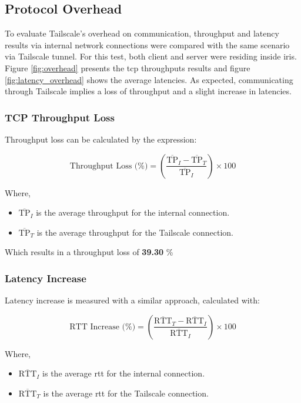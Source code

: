 \documentclass[11pt,twoside,a4paper]{report}
\begin{document}
\subsection{Protocol Overhead}

To evaluate Tailscale's overhead on communication, throughput and latency results via internal network connections were compared with the same scenario via Tailscale tunnel. For this test, both client and server were residing inside \ac{iris}. Figure \ref{fig:overhead} presents the \ac{tcp} throughputs results and figure \ref{fig:latency_overhead} shows the average latencies. As expected, communicating through Tailscale implies a loss of throughput and a slight increase in latencies.

\subsubsection{TCP Throughput Loss}

Throughput loss can be calculated by the expression:

\[
\text{Throughput Loss (\%)} = \left( \frac{ \overline{\text{TP}}_I - \overline{\text{TP}}_T }{ \overline{\text{TP}}_I } \right) \times 100
\]

Where,

\begin{itemize}
    \item \( \overline{\text{TP}}_I \) is the average throughput for the internal connection.
    \item \( \overline{\text{TP}}_T \) is the average throughput for the Tailscale connection.
\end{itemize}

Which results in a throughput loss of \textbf{39.30} \%


\subsubsection{Latency Increase}

Latency increase is measured with a similar approach, calculated with:

\[
\text{RTT Increase (\%)} = \left( \frac{ \overline{\text{RTT}}_T - \overline{\text{RTT}}_I}{ \overline{\text{RTT}}_I }\right) \times 100
\]

Where,

\begin{itemize}
    \item \( \overline{\text{RTT}}_I \) is the average \ac{rtt} for the internal connection.
    \item \( \overline{\text{RTT}}_T \) is the average \ac{rtt} for the Tailscale connection.
\end{itemize}
\end{document}

